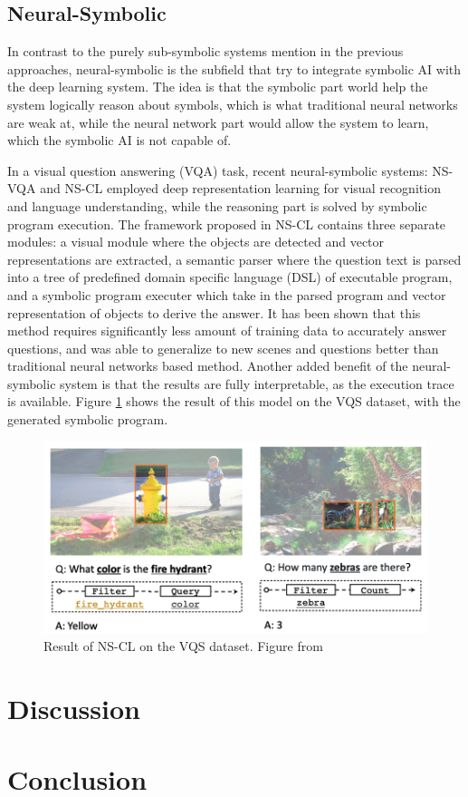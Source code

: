\documentclass[journal]{IEEEtran}
\begin{document}
\subsection{Neural-Symbolic}

In contrast to the purely sub-symbolic systems mention in the previous approaches, neural-symbolic is the subfield that try to integrate symbolic AI with the deep learning system. 
The idea is that the symbolic part world help the system logically reason about symbols, which is what traditional neural networks are weak at, 
while the neural network part would allow the system to learn, which the symbolic AI is not capable of.

In a visual question answering (VQA) task, recent neural-symbolic systems: NS-VQA \cite{nsvqa} and NS-CL \cite{Mao2019NeuroSymbolic} employed deep representation learning
for visual recognition and language understanding, while the reasoning part is solved by symbolic program execution.
The framework proposed in NS-CL contains three separate modules: 
a visual module where the objects are detected and vector representations are extracted, 
a semantic parser where the question text is parsed into a tree of predefined domain specific language (DSL) of executable program,
and a symbolic program executer which take in the parsed program and vector representation of objects to derive the answer. 
It has been shown that this method requires significantly less amount of training data to accurately answer questions, 
and was able to generalize to new scenes and questions better than traditional neural networks based method. 
Another added benefit of the neural-symbolic system is that the results are fully interpretable, as the execution trace is available.
Figure \ref{nscl} shows the result of this model on the VQS dataset, with the generated symbolic program.

\begin{figure}[htb]
  \includegraphics[width=\linewidth]{nscl.png}
  \caption{Result of NS-CL on the VQS dataset. Figure from \cite{Mao2019NeuroSymbolic}}
  \label{nscl}
\end{figure}

\section{Discussion}

\section{Conclusion}



\end{document}
